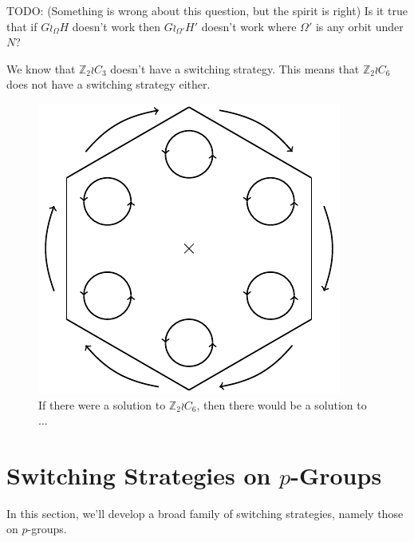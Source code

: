TODO: (Something is wrong about this question, but the spirit is right)
Is it true that if $G \wr_\Omega H$ doesn't work then $G \wr_{\Omega'} H'$
doesn't work where $\Omega'$ is any orbit under $N$?
\begin{example}
  We know that $\mathbb Z_2 \wr C_3$ doesn't have a switching strategy.
  This means that $\mathbb Z_2 \wr C_6$ does not have a switching strategy either.
  \begin{figure}
    \includegraphics{assets/tikz_Z2C6.pdf}
    \caption{If there were a solution to $\mathbb Z_2 \wr C_6$, then there
    would be a solution to ...}
  \end{figure}
\end{example}

%
%
\section{Switching Strategies on \texorpdfstring{$p$}{p}-Groups}
\label{sec:pGroupStrategy}
In this section, we'll develop a broad family of switching strategies,
namely those on $p$-groups.

